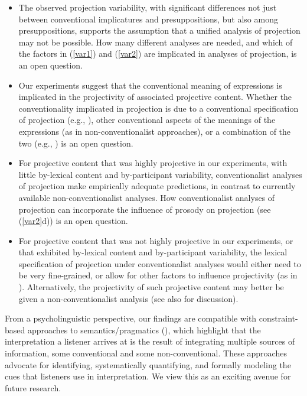 \documentclass[11pt,fleqn]{article}
\newcommand{\6}{\mbox{$[\hspace*{-.6mm}[$}}
\newcommand{\9}{\mbox{$]\hspace*{-.6mm}]$}}
\begin{document}
\begin{itemize}[topsep=0pt,itemsep=-1pt]

\item The observed projection variability, with significant differences not just between conventional implicatures and presuppositions, but also among presuppositions, supports the assumption that a unified analysis of projection may not be possible. How many different analyses are needed, and which of the factors in (\ref{var1}) and (\ref{var2}) are implicated in analyses of projection, is an open question. 

\item Our experiments suggest that the conventional meaning of expressions is implicated in the projectivity of associated projective content. Whether the conventionality implicated in projection is due to a conventional specification of projection (e.g., \citealt{heim83,vds92}), other conventional aspects of the meanings of the expressions (as in non-conventionalist approaches), or a combination of the two (e.g., \citealt{abrusan2011,abrusan2016}) is an open question.

\item For projective content that was highly projective in our experiments, with little by-lexical content and by-participant variability, conventionalist analyses of projection make empirically adequate predictions, in contrast to currently available non-conventionalist analyses. How conventionalist analyses of projection can incorporate the influence of prosody on projection (see (\ref{var2}d)) is an open question.

\item For projective content that was not highly projective in our experiments, or that exhibited by-lexical content and by-participant variability, the lexical specification of projection under conventionalist analyses would either need to be very fine-grained, or allow for other factors to influence projectivity (as in \citealt{abrusan2011,abrusan2016}). Alternatively, the projectivity of such projective content may better be given a non-conventionalist analysis (see also \citealt{kadmon01} for discussion).

\end{itemize}

From a psycholinguistic perspective, our findings are compatible with constraint-based approaches to semantics/pragmatics (\citealt{degentanenhaus2015}), which highlight that the interpretation a listener arrives at is the result of integrating multiple sources of information, some conventional and some non-conventional. These approaches advocate for identifying, systematically quantifying, and formally modeling the cues that listeners use in interpretation. We view this as an exciting avenue for future research.
\end{document}
